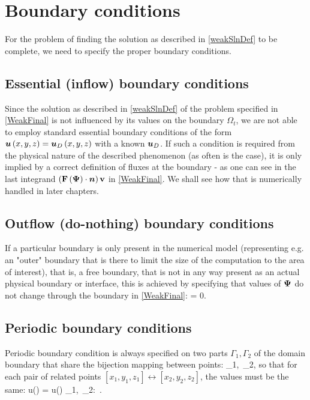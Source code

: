 \section{Boundary conditions}
\label{section:bcs}
For the problem of finding the solution as described in \cref{weakSlnDef} to be complete, we need to specify the proper boundary conditions.
\subsection{Essential (inflow) boundary conditions}

Since the solution as described in \cref{weakSlnDef} of the problem specified in \cref{WeakFinal} is not influenced by its values on the boundary $\Omega_t$, we are not able to employ standard essential boundary conditions of the form $\mbox{\boldmath $u$}\left(x, y, z\right) = \mbox{\boldmath $u$}_D\left(x, y, z\right)$ with a known $\mbox{\boldmath $u$}_D$.
If such a condition is required from the physical nature of the described phenomenon (as often is the case), it is only implied by a correct definition of fluxes at the boundary - as one can see in the last integrand $\left(\mathrm{\mathbf{F}}\left(\mathrm{\mathbf{\Psi}}\right) \cdot \mbox{\boldmath $n$} \right)\mathrm{\mathbf{v}}$ in \cref{WeakFinal}. We shall see how that is numerically handled in later chapters.


\subsection{Outflow (do-nothing) boundary conditions}
If a particular boundary is only present in the numerical model (representing e.g. an "outer" boundary that is there to limit the size of the computation to the area of interest), that is, a free boundary, that is not in any way present as an actual physical boundary or interface, this is achieved by specifying that values of $\mathrm{\mathbf{\Psi}}$ do not change through the boundary in \cref{WeakFinal}:
\be
\label{bcoutdef}
\frac{\partial\mrPsi}{\partial\bfn} = 0.
\ee

\subsection{Periodic boundary conditions}
Periodic boundary condition is always specified on two parts $\Gamma_1, \Gamma_2$ of the domain boundary that share the bijection mapping between points:
\be
\label{periodicMapping}
\left[x_1, y_1, z_1\right] \leftrightarrow \left[x_2, y_2, z_2\right] \forall \left[x_1, y_1, z_1\right] \in \Gamma_1,\ \forall \left[x_2, y_2, z_2\right] \in \Gamma_2,
\ee
so that for each pair of related points $\left[x_1, y_1, z_1\right] \leftrightarrow \left[x_2, y_2, z_2\right]$, the values must be the same:
\be
\label{periodicBCs}
u\left(\left[x_1, y_1, z_1\right]\right) = u\left(\left[x_2, y_2, z_2\right]\right) \forall \left[x_1, y_1, z_1\right] \in \Gamma_1,\ \forall \left[x_2, y_2, z_2\right] \in \Gamma_2:\, \left[x_1, y_1, z_1\right] \leftrightarrow \left[x_2, y_2, z_2\right].
\ee
